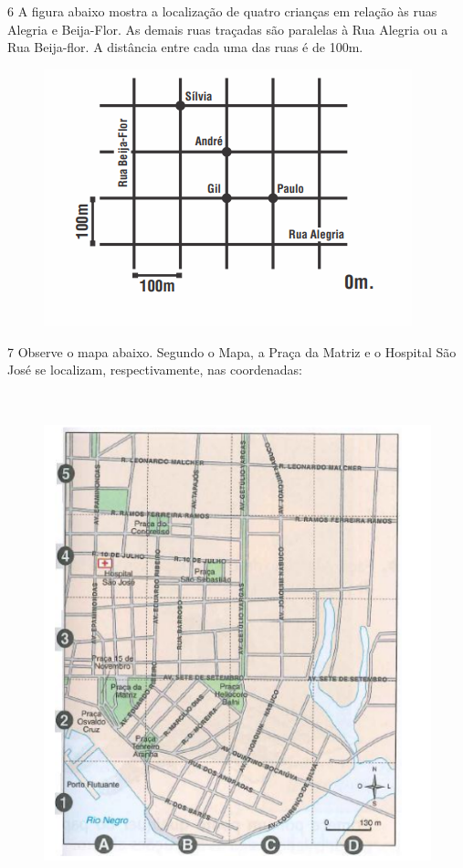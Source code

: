 
\num{6}  A figura abaixo mostra a localização de quatro crianças em relação às
ruas Alegria e Beija-Flor. As demais ruas traçadas são paralelas à Rua
Alegria ou a Rua Beija-flor. A distância entre cada uma das ruas é de
100m.

\begin{figure}
\includegraphics[width=4.19792in,height=2.93056in]{./imgSAEB_6_MAT/media/image69.png}
\end{figure}


\num{7}  Observe o mapa abaixo. Segundo o Mapa, a Praça da Matriz e o Hospital São José se localizam,
respectivamente, nas coordenadas:

\begin{figure}
\includegraphics[width=5.08333in,height=5.71875in]{./imgSAEB_6_MAT/media/image70.png}
\end{figure}

